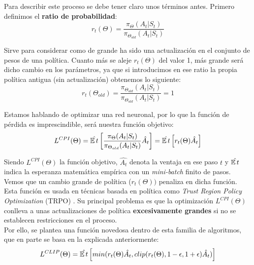 \documentclass[11pt,fleqn]{book} %
\begin{document}
Para describir este proceso se debe tener claro unos términos antes. Primero definimos el \textbf{ratio de probabilidad}: \\

\begin{equation}
r_t(\Theta)=\frac{\pi_\Theta(A_t|S_t)}{\pi_{\Theta_{old}}(A_t|S_t)}
\end{equation}

Sirve para considerar como de grande ha sido una actualización en el conjunto de pesos de una política. Cuanto más se aleje $r_t(\Theta)$ del valor 1, más grande será dicho cambio en los parámetros, ya que si introducimos en ese ratio la propia política antigua (sin actualización) obtenemos lo siguiente: \\

\begin{equation}
r_t(\Theta_{old})=\frac{\pi_{\Theta_{old}}(A_t|S_t)}{\pi_{\Theta_{old}}(A_t|S_t)}=1
\end{equation}

Estamos hablando de optimizar una red neuronal, por lo que la función de pérdida es imprescindible, será nuestra función objetivo: \\

\begin{equation}
L^{CPI}(\Theta)=\hat{\operatorname*{\mathbb{E}} t}\left[\frac{\pi_\Theta(A_t|S_t)}{\pi_{\Theta_{old}}(A_t|S_t)}\hat{A_t}\right]=\hat{\operatorname*{\mathbb{E}} t}\left[r_t(\Theta)\hat{A_t}\right] 
\end{equation}

Siendo $L^{CPI}(\Theta)$ la función objetivo, $\hat{A_t}$ denota la ventaja en ese paso $t$ y $\hat{\operatorname*{\mathbb{E}} t}$ indica la esperanza matemática empírica con un \textit{mini-batch} finito de pasos. Vemos que un cambio grande de política ($r_t(\Theta))$ penaliza en dicha función.\\

Esta función es usada en técnicas basada en política como \textit{Trust Region Policy Optimization} (TRPO) \cite{article:TRPO}. Su principal problema es que la optimización $L^{CPI}(\Theta)$ conlleva a unas actualizaciones de política \textbf{excesivamente grandes} si no se establecen restricciones en el proceso. \\

Por ello, se plantea una función novedosa dentro de esta familia de algoritmos, que en parte se basa en la explicada anteriormente: \\

\begin{equation}
L^{CLIP}(\Theta)=\hat{\operatorname*{\mathbb{E}} t}\left[min(r_t(\Theta)\hat{A_t},clip(r_t(\Theta),1-\epsilon,1+\epsilon)\hat{A_t})\right]
\end{equation}
\end{document}
